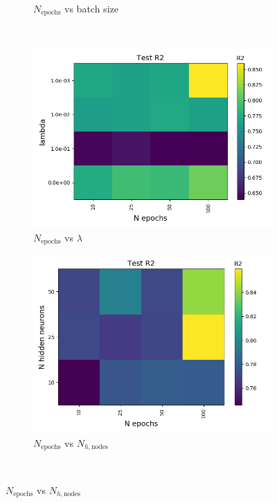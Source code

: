 \documentclass[a4paper]{article}
\newcommand{\Nepochs}{N_{\text{epochs}}}
\newcommand{\Nhn}{N_{h,\text{nodes}}}
\begin{document}
\begin{figure}[H]
\begin{subfigure}{0.49\textwidth}
    \caption{$\Nepochs$ vs batch size}
  \end{subfigure}\\
  \begin{subfigure}{0.49\textwidth}
    \includegraphics[scale=0.45]{../figures/task_b/test/heatmap_test_lr_constant_Nhyp443431_R2_n_epochs_lambdas.png}
    \caption{$\Nepochs$ vs $\lambda$}
  \end{subfigure}
  \begin{subfigure}{0.49\textwidth}
    \includegraphics[scale=0.45]{../figures/task_b/test/heatmap_test_lr_constant_Nhyp443431_R2_n_epochs_nhn.png}
    \caption{$\Nepochs$ vs $\Nhn$}
  \end{subfigure}\\

\end{figure}
\end{document}
